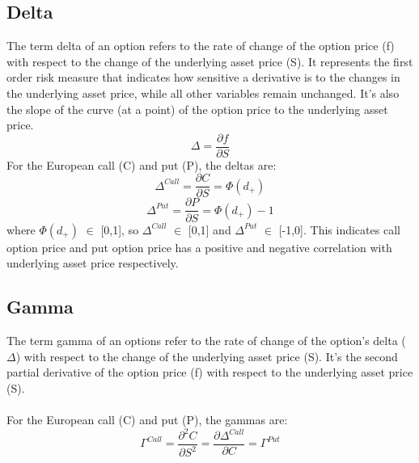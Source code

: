 \documentclass[12pt]{article}
\begin{document}
\subsection{Delta}
The term delta of an option refers to the rate of change of the option price (f) with respect to the change of the underlying asset price (S). It represents the first order risk measure that indicates how sensitive a derivative is to the changes in the underlying asset price, while all other variables remain unchanged. It’s also the slope of the curve (at a point) of the option price to the underlying asset price. 
\begin{equation}
    {\Delta} = {\frac{{\partial f}}{{\partial S}}}
\end{equation}
For the European call (C) and put (P), the deltas are:
\begin{equation}
    {\Delta^{Call}} = {\frac{{\partial C}}{{\partial S}}} = \Phi(d_+)
\end{equation}
\begin{equation}
    {\Delta^{Put}} = {\frac{{\partial P}}{{\partial S}}} = \Phi(d_+)-1
\end{equation}
where
${\Phi(d_+)}$ $\in$ [0,1], so ${\Delta^{Call}}$ $\in$ [0,1] and ${\Delta^{Put}}$ $\in$ [-1,0]. This indicates call option price and put option price has a positive and negative correlation with underlying asset price respectively.

\subsection{Gamma}
The term gamma of an options refer to the rate of change of the option’s delta ($\Delta$) with respect to the change of the underlying asset price (S).  It’s the second partial derivative of the option price (f) with respect to the underlying asset price (S).\\
\\For the European call (C) and put (P), the gammas are:
\begin{equation}
    {\Gamma^{Call}} = {\frac {\partial^2 C} {\partial S^2}} = {\frac {\partial \Delta^{Call}} {\partial C}} = {\Gamma^{Put}}
\end{equation}
\end{document}
